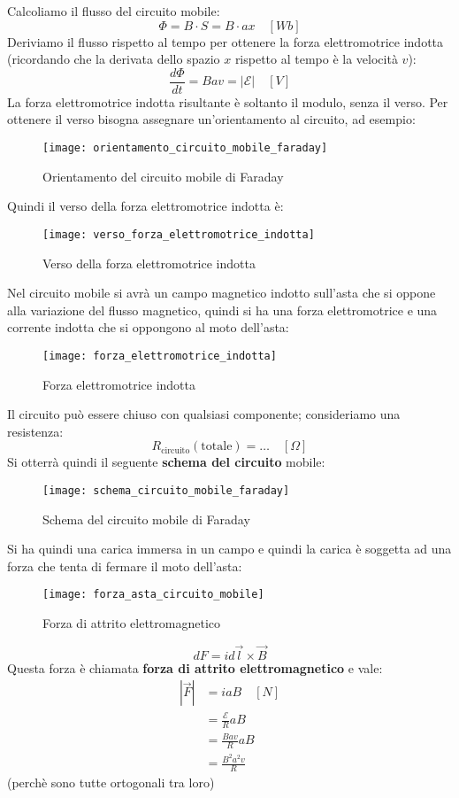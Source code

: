 \documentclass[a4paper]{article}
\begin{document}
\vspace{1em}
\noindent
Calcoliamo il flusso del circuito mobile:
\[
  \Phi = B \cdot S = B \cdot ax \quad \left[ Wb \right]
\] 
Deriviamo il flusso rispetto al tempo per ottenere la forza elettromotrice indotta
(ricordando che la derivata dello spazio \( x \) rispetto al tempo è la velocità \( v \)):
\[
  \frac{d \Phi }{dt} = B a v = |\mathcal{E}| \quad \left[ V \right]
\] 
La forza elettromotrice indotta risultante è soltanto il modulo, senza il verso. Per
ottenere il verso bisogna assegnare un'orientamento al circuito, ad esempio:
\begin{figure}[H]
  \centering
  \texttt{[image: orientamento\_circuito\_mobile\_faraday]}
  \caption{Orientamento del circuito mobile di Faraday}
\end{figure}
\noindent
Quindi il verso della forza elettromotrice indotta è:
\begin{figure}[H]
  \centering
  \texttt{[image: verso\_forza\_elettromotrice\_indotta]}
  \caption{Verso della forza elettromotrice indotta}
\end{figure}
\noindent
Nel circuito mobile si avrà un campo magnetico indotto sull'asta che si oppone
alla variazione del flusso magnetico, quindi si ha una forza elettromotrice e una
corrente indotta che si oppongono al moto dell'asta:
\begin{figure}[H]
  \centering
  \texttt{[image: forza\_elettromotrice\_indotta]}
  \caption{Forza elettromotrice indotta}
\end{figure}
\noindent
Il circuito può essere chiuso con qualsiasi componente; consideriamo una resistenza:
\[
  R_{\text{circuito}}(\text{totale}) = \ldots \quad \left[ \Omega \right]
\] 
Si otterrà quindi il seguente \textbf{schema del circuito} mobile:
\begin{figure}[H]
  \centering
  \texttt{[image: schema\_circuito\_mobile\_faraday]}
  \caption{Schema del circuito mobile di Faraday}
\end{figure}
\noindent
Si ha quindi una carica immersa in un campo e quindi la carica è soggetta ad una forza
che tenta di fermare il moto dell'asta:
\begin{figure}[H]
  \centering
  \texttt{[image: forza\_asta\_circuito\_mobile]}
  \caption{Forza di attrito elettromagnetico}
\end{figure}
\[
  dF = i d\vec{l} \times \vec{B}
\]
Questa forza è chiamata \textbf{forza di attrito elettromagnetico} e vale:
\[
  \begin{aligned}
    |\vec{F}| &= ia B \quad \left[ N \right]\\
              &= \frac{\mathcal{E}}{R} aB \\
              &= \frac{Bav}{R} aB\\
              &= \frac{B^2 a^2 v}{R}
  \end{aligned}
\] 
(perchè sono tutte ortogonali tra loro)
\end{document}
